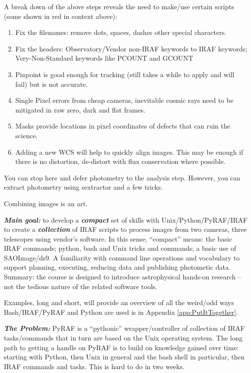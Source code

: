 A break down of the above steps reveals the need to make/use
certain scripts (some shown in red in context above):

\vspace{-.15cm}
\begin{enumerate}[resume]\addtolength{\itemsep}{-0.5\baselineskip}
   \item   Fix the filenames: remove dots, spaces, dashes other special characters.
   \item   Fix the headers: Observatory/Vendor non-IRAF keywords to IRAF
keywords; Very-Non-Standard keywords like PCOUNT and GCOUNT
   \item   Pinpoint is good enough for tracking (still takes a while to apply
and will fail) but is not accurate.
   \item   Single Pixel errors from cheap cameras, inevitable cosmic rays need
to be mitigated in raw zero, dark and flat frames.
   \item   Masks provide locations in pixel coordinates of defects that can ruin
the science.
   \item   Adding a new WCS will help to quickly align images. This may be enough
if there is no distortion, de-distort with flux conservation where possible.
\end{enumerate}


You can stop here and defer photometry to the analysis step. However,
you can extract photometry using sextractor and a few tricks.

Combining images is an art.


\textbf{\emph{Main goal:}} to develop a \textbf{\emph{compact}} set of
skills with Unix/Python/PyRAF/IRAF to create a
\textbf{\emph{collection}} of IRAF scripts to process images from two
cameras, three telescopes using vendor's software. In this sense,
``compact'' means: the basic IRAF commands; python, bash and Unix
tricks and commands; a basic use of SAOImage/ds9. A familiarity with
command line operations and vocabulary to support planning, executing,
reducing data and publishing photometic data. Summary: the course is
designed to introduce astrophysical hands-on research -- not the
tedious nature of the related software tools.

Examples, long and short, will provide an overview of all the weird/odd ways
Bash/IRAF/PyRAF and Python are used is in Appendix \ref{app:PutItTogether}.

\textbf{\emph{The Problem:}} PyRAF is a ``pythonic''
wrapper/controller of collection of IRAF tasks/commands that in turn
are based on the Unix operating system. The long path to getting a
handle on PyRAF is to build on knowledge gained over time: starting
with Python, then Unix in general and the bash shell in particular,
then IRAF commands and tasks. This is hard to do in two weeks.

